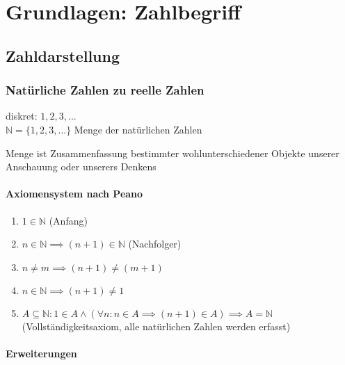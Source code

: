 \chapter{Grundlagen: Zahlbegriff}

\section{Zahldarstellung}
\subsection{Natürliche Zahlen zu reelle Zahlen}
diskret: $1,2,3,...$\\
$\mathbb{N} = \{1,2,3,...\}$ Menge der natürlichen Zahlen
\begin{definition}
 Menge ist Zusammenfassung bestimmter wohlunterschiedener Objekte unserer Anschauung oder unserers Denkens
\end{definition}

\subsubsection*{Axiomensystem nach Peano}
\begin{enumerate}
 \item $1 \in \mathbb{N}$ (Anfang)
 \item $n \in \mathbb{N} \implies (n+1) \in \mathbb{N}$ (Nachfolger)
 \item $n \neq m \implies (n+1) \neq (m+1)$
 \item $n \in \mathbb{N} \implies (n+1) \neq 1$
 \item $A \subseteq \mathbb{N}: 1 \in A \wedge (\forall n: n \in A \implies (n+1) \in A) \implies A = \mathbb{N}$ (Vollständigkeitsaxiom, alle natürlichen Zahlen werden erfasst)
\end{enumerate}

\subsubsection*{Erweiterungen}

